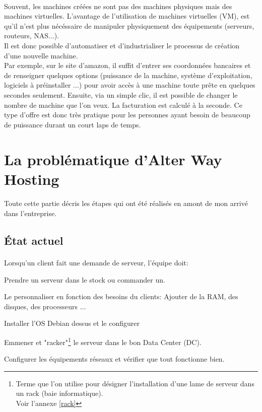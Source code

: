 \paragraph*{}
Souvent, les machines créées ne sont pas des machines physiques mais des machines virtuelles. L'avantage de l'utilisation de machines virtuelles (VM), est
qu'il n'est plus nécéssaire de manipuler physiquement des équipements (serveurs, routeurs, NAS...).
\\
Il est donc possible d'automatiser et d'industrialiser le processus de création d'une nouvelle machine.
\\
Par exemple, sur le site d'amazon, il suffit d'entrer ses coordonnées bancaires et de renseigner quelques options (puissance de la machine, système d'exploitation, logiciels à préinstaller ...)
 pour avoir accès à une machine toute prête en quelques secondes seulement. Ensuite, via un simple clic, il est possible de changer le nombre de machine que l'on veux.
La facturation est calculé à la seconde. Ce type d'offre est donc très pratique pour les personnes ayant besoin de beaucoup de puissance durant un court laps de temps.

\section{La problématique d'Alter Way Hosting}

\paragraph*{}
Toute cette partie décris les étapes qui ont été réalisés en amont de mon arrivé dans l'entreprise.

\subsection{État actuel}
\paragraph*{}
Lorsqu'un client fait une demande de serveur, l'équipe doit:
\begin{listi}
	\item Prendre un serveur dans le stock ou commander un.
	\item Le personnaliser en fonction des besoins du clients: Ajouter de la RAM, des disques, des processeurs ...
	\item Installer l'OS Debian dessus et le configurer
	\item Emmener et "racker"\footnote{Terme que l'on utilise pour désigner l'installation d'une lame de serveur dans un rack (baie informatique).\\
		Voir l'annexe \ref{rack}} le serveur
	dans le bon Data Center (DC).
	\item Configurer les équipements réseaux et vérifier que tout fonctionne bien.
\end{listi}

